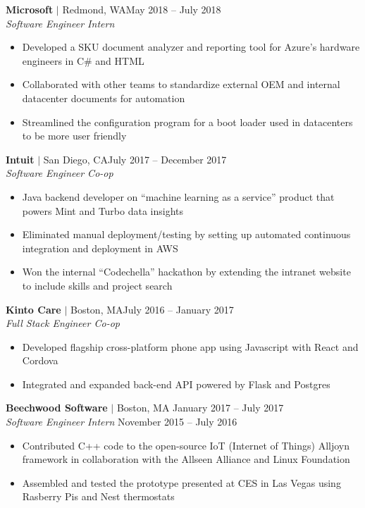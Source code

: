 \documentclass[overlapped,line]{res}
\begin{document}
\begin{resume}
\textbf{Microsoft} $|$ Redmond, WA\hfill May 2018 \--- July 2018\\
{\sl Software Engineer Intern}
\begin{itemize} \itemsep -2pt
	\item Developed a SKU document analyzer and reporting tool for Azure's hardware engineers in C\# and HTML
	\item Collaborated with other teams to standardize external OEM and internal datacenter documents for automation
	\item Streamlined the configuration program for a boot loader used in datacenters to be more user friendly
\end{itemize}

\textbf{Intuit} $|$ San Diego, CA\hfill July 2017 \--- December 2017\\
{\sl Software Engineer Co-op}
\begin{itemize} \itemsep -2pt
	\item Java backend developer on ``machine learning as a service'' product that powers Mint and Turbo data insights
	\item Eliminated manual deployment/testing by setting up automated
      continuous integration and deployment in AWS
	\item Won the internal ``Codechella'' hackathon by extending the intranet website to include skills and project search
\end{itemize}

\textbf{Kinto Care} $|$ Boston, MA\hfill July 2016 \--- January 2017\\
{\sl Full Stack Engineer Co-op}
\begin{itemize} \itemsep -2pt
	\item Developed flagship cross-platform phone app using Javascript with React and Cordova
	\item Integrated and expanded back-end API powered by Flask and Postgres
\end{itemize}

\textbf{Beechwood Software} $|$ Boston, MA \hfill January 2017 \--- July 2017\\
{\sl Software Engineer Intern} \hfill November 2015 \--- July 2016
\begin{itemize}  \itemsep -2pt
	\item Contributed C++ code to the open-source IoT (Internet of Things) Alljoyn framework in collaboration with the Allseen Alliance and Linux Foundation
	\item Assembled and tested the prototype presented at CES in Las Vegas using Rasberry Pis and Nest thermostats
\end{itemize}
\vspace{-1em}
\noindent\makebox[7.15in]{\rule{7.15in}{0.4pt}}


\end{resume}
\end{document}
